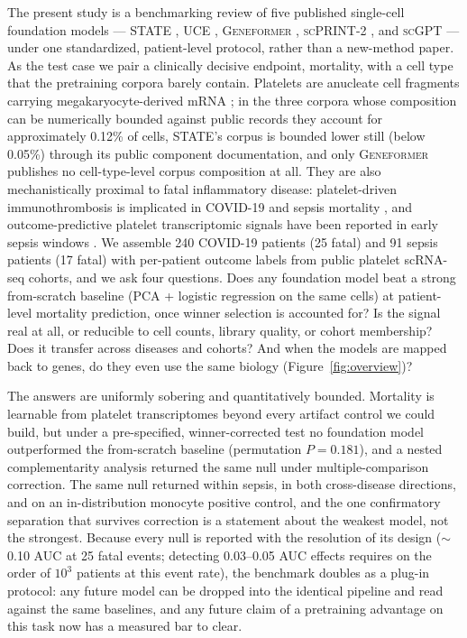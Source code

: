 \documentclass[11pt,a4paper]{article}
\newcommand{\model}[1]{\textsc{#1}}
\begin{document}
The present study is a benchmarking review of five published single-cell
foundation models --- \model{STATE} \citep{adduri2025state}, \model{UCE}
\citep{rosen2026universal}, \model{Geneformer}
\citep{theodoris2023geneformer}, \model{scPRINT-2} \citep{kalfon2025scprint},
and \model{scGPT} \citep{cui2024scgpt} --- under one standardized,
patient-level protocol, rather than a new-method paper. As the test case we
pair a clinically decisive endpoint, mortality, with a cell type that the
pretraining corpora barely contain. Platelets are anucleate cell fragments
carrying megakaryocyte-derived mRNA
\citep{rowley2011genomewide, bray2013complex, zaid2020platelets}; in the
three corpora whose composition
can be numerically bounded against public records they account for
approximately 0.12\% of cells, \model{STATE}'s corpus is bounded lower still
(below 0.05\%) through its public component documentation, and only
\model{Geneformer} publishes no cell-type-level corpus composition at all.
They are also mechanistically proximal to fatal inflammatory disease:
platelet-driven immunothrombosis is implicated in COVID-19 and sepsis
mortality \citep{manne2020platelet, barrett2021platelets, hottz2020platelet,
ackermann2020pulmonary, nicolai2020immunothrombotic, levi2020coagulation,
shappell2023sars},
and outcome-predictive platelet transcriptomic signals have been reported in
early sepsis windows
\citep{qiu2021sepsis, middleton2019sepsis, middleton2020nets, qiu2024deciphering}. We assemble
240 COVID-19 patients (25 fatal) and 91 sepsis patients (17 fatal) with
per-patient outcome labels from public platelet scRNA-seq cohorts, and we ask
four questions. Does any foundation model beat a strong from-scratch baseline
(PCA + logistic regression on the same cells) at patient-level mortality
prediction, once winner selection is accounted for? Is the signal real at
all, or reducible to cell counts, library quality, or cohort membership? Does
it transfer across diseases and cohorts? And when the models are mapped back
to genes, do they even use the same biology
(Figure~\ref{fig:overview})?

The answers are uniformly sobering and quantitatively bounded. Mortality is
learnable from platelet transcriptomes beyond every artifact control we could
build, but under a pre-specified, winner-corrected test no foundation model
outperformed the from-scratch baseline (permutation $P = 0.181$), and a
nested complementarity analysis returned the same null under
multiple-comparison correction. The same null returned within sepsis, in both
cross-disease directions, and on an in-distribution monocyte positive control,
and the one confirmatory separation that survives correction is a statement
about the weakest model, not the strongest. Because every null is reported
with the resolution of its design ($\sim$0.10 AUC at 25 fatal events;
detecting 0.03--0.05 AUC effects requires on the order of $10^3$ patients at
this event rate), the benchmark doubles as a plug-in protocol: any future
model can be dropped into the identical pipeline and read against the same
baselines, and any future claim of a pretraining advantage on this task now
has a measured bar to clear.
\end{document}
